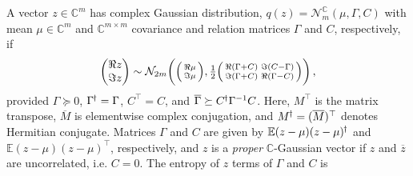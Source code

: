\documentclass[a4paper,10pt,onecolumn]{article}
\newcommand{\cplx}{\mathbb{C}}
\newcommand{\hop}{{\mkern-1.5mu\dagger}}
\newcommand{\conj}[1]{\overline{#1}}
\begin{document}
A vector $z\in \cplx^m$ has complex Gaussian distribution, $
  q(z) = \mathcal{N}^{\cplx}_m(\mu, \Gamma, C)
$ with mean $\mu \in \cplx^m$ and $\cplx^{m\times m}$ covariance and relation matrices
$\Gamma$ and $C$, respectively, if
\begin{equation}  \label{eq:cn-paired-real-density}
  \begin{pmatrix}
    \Re z \\ \Im z
  \end{pmatrix}
    \sim \mathcal{N}_{2 m}\biggl(
      \Bigl(
        \begin{smallmatrix}
          \Re \mu \\ \Im \mu
        \end{smallmatrix}
      \Bigr),
      \tfrac12 \Bigl(
        \begin{smallmatrix}
          \Re{(\Gamma + C)} & \Im{(C - \Gamma)} \\
          \Im{(\Gamma + C)} & \Re{(\Gamma - C)}
        \end{smallmatrix}
      \Bigr)
    \biggr)
    \,,
\end{equation}
provided $\Gamma \succeq 0$, $\Gamma^{\hop} = \Gamma$, $C^\top = C$, and $
  \conj{\Gamma} \succeq C^{\hop} \Gamma^{-1} C
$.
Here, $M^{\top}$ is the matrix transpose, $\conj{M}$ is elementwise complex
conjugation, and $M^{\hop} = (\conj{M})^\top$ denotes Hermitian conjugate.
%
Matrices $\Gamma$ and $C$ are given by $
  \mathbb{E} (z - \mu)(z - \mu)^{\hop}
$ and $
  \mathbb{E} (z - \mu)(z - \mu)^{\top}
$, respectively, and $z$ is a \textit{proper} $\cplx$-Gaussian vector if $z$ and
$\conj{z}$ are uncorrelated, i.e. $C = 0$.
%
The entropy of $z$ terms of $\Gamma$ and $C$ is
\end{document}
